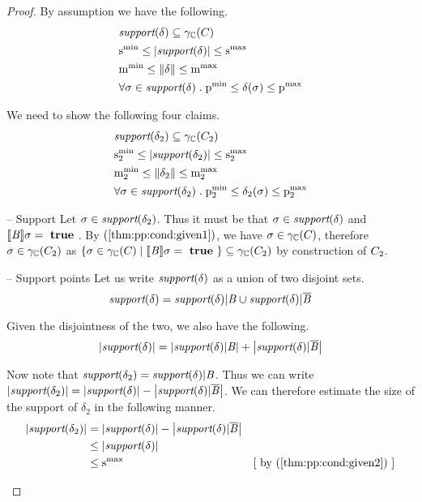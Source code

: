 \begin{proof}
By assumption we have the following.
\begin{align}
\label{thm:pp:cond:given1} & \support{\delta} \subseteq \pconc{C} \\
\label{thm:pp:cond:given2} & \smin{} \leq \setsize{\support{\delta}} \leq \smax{} \\
\label{thm:pp:cond:given3} & \mmin{} \leq \pmass{\delta} \leq \mmax{} \\
\label{thm:pp:cond:given4} & \forall \sigma \in \support{\delta} \;
. \; \pmin{} \leq \delta(\sigma) \leq \pmax{}
\end{align}

We need to show the following four claims.
\begin{align}
\label{thm:pp:cond:cond1}& \support{\delta_2} \subseteq \pconc{\getpoly{2}} \\
\label{thm:pp:cond:cond2}& \smin{2} \leq \setsize{\support{\delta_2}} \leq \smax{2} \\
\label{thm:pp:cond:cond3}& \mmin{2} \leq \pmass{\delta_2} \leq \mmax{2} \\
\label{thm:pp:cond:cond4}& \forall \sigma \in \support{\delta_2} \;
. \; \pmin{2} \leq \delta_2(\sigma) \leq \pmax{2}
\end{align}

\begin{subproof}{ -- Support} Let
$ \sigma \in \textit{support}(\delta_2) $. Thus it must be that
$ \sigma \in \textit{support}(\delta) $ and $ [\![{\mathit{B}}]\!]{\sigma} = \text{ \textbf{true} }
$. By $ \cnumref{thm:pp:cond:given1} $, we have
$ \sigma \in \gamma_{\mathbb{C}}(C_{}) $, therefore
$ \sigma \in \gamma_{\mathbb{C}}(C_{2}) $ as
$ \left\{ \sigma \in \gamma_{\mathbb{C}}(C_{}) \;|\; [\![{\mathit{B}}]\!]{\sigma}
= \text{ \textbf{true} } \right\} \subseteq \gamma_{\mathbb{C}}(C_{2}) $ by construction of
$ C_{2} $.
\end{subproof}

\newcommand{\supdn}[0]{\support{\delta_2}}

\begin{subproof}{ -- Support points} Let us write
$ \textit{support}(\delta) $ as a union of two disjoint sets.
$$ \textit{support}(\delta) = \textit{support}(\delta) | \mathit{B} \cup \textit{support}(\delta) | \overline{\mathit{B}} $$

Given the disjointness of the two, we also have the following.
$$ \left| \textit{support}(\delta) \right| = \left| \textit{support}(\delta) | \mathit{B} \right| + \left| \textit{support}(\delta) | \overline{\mathit{B}} \right| $$

Now note that $ \supdn = \supin $. Thus we can write
$ \setsize{\supdn} = \setsize{\supd} - \setsize{\supout} $. We can
therefore estimate the size of the support of $ \delta_2 $ in the
following manner.
\begin{align*}
\setsize{\supdn} & = \setsize{\supd} - \setsize{\supout} \\
& \leq \setsize{\supd} \\
& \leq \smax{} & \mathstep{by \cnumref{thm:pp:cond:given2}}
\end{align*}


\end{subproof}
\end{proof}
